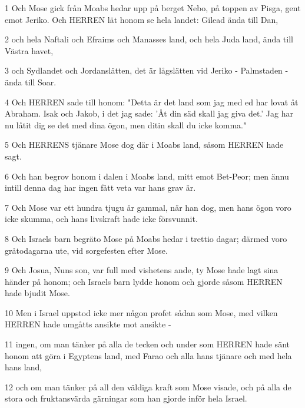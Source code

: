 \par 1 Och Mose gick från Moabs hedar upp på berget Nebo, på toppen av Pisga, gent emot Jeriko. Och HERREN lät honom se hela landet: Gilead ända till Dan,
\par 2 och hela Naftali och Efraims och Manasses land, och hela Juda land, ända till Västra havet,
\par 3 och Sydlandet och Jordanslätten, det är lågslätten vid Jeriko - Palmstaden - ända till Soar.
\par 4 Och HERREN sade till honom: "Detta är det land som jag med ed har lovat åt Abraham. Isak och Jakob, i det jag sade: 'Åt din säd skall jag giva det.' Jag har nu låtit dig se det med dina ögon, men ditin skall du icke komma."
\par 5 Och HERRENS tjänare Mose dog där i Moabs land, såsom HERREN hade sagt.
\par 6 Och han begrov honom i dalen i Moabs land, mitt emot Bet-Peor; men ännu intill denna dag har ingen fått veta var hans grav är.
\par 7 Och Mose var ett hundra tjugu år gammal, när han dog, men hans ögon voro icke skumma, och hans livskraft hade icke försvunnit.
\par 8 Och Israels barn begräto Mose på Moabs hedar i trettio dagar; därmed voro gråtodagarna ute, vid sorgefesten efter Mose.
\par 9 Och Josua, Nuns son, var full med vishetens ande, ty Mose hade lagt sina händer på honom; och Israels barn lydde honom och gjorde såsom HERREN hade bjudit Mose.
\par 10 Men i Israel uppstod icke mer någon profet sådan som Mose, med vilken HERREN hade umgåtts ansikte mot ansikte -
\par 11 ingen, om man tänker på alla de tecken och under som HERREN hade sänt honom att göra i Egyptens land, med Farao och alla hans tjänare och med hela hans land,
\par 12 och om man tänker på all den väldiga kraft som Mose visade, och på alla de stora och fruktansvärda gärningar som han gjorde inför hela Israel.


